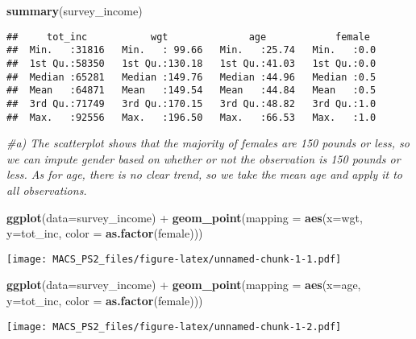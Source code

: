 \documentclass[]{article}
\newenvironment{Shaded}{\begin{snugshade}}{\end{snugshade}}
\newcommand{\KeywordTok}[1]{\textcolor[rgb]{0.13,0.29,0.53}{\textbf{{#1}}}}
\newcommand{\DataTypeTok}[1]{\textcolor[rgb]{0.13,0.29,0.53}{{#1}}}
\newcommand{\StringTok}[1]{\textcolor[rgb]{0.31,0.60,0.02}{{#1}}}
\newcommand{\CommentTok}[1]{\textcolor[rgb]{0.56,0.35,0.01}{\textit{{#1}}}}
\newcommand{\NormalTok}[1]{{#1}}
\begin{document}
\begin{Shaded}
\begin{Highlighting}[]
\KeywordTok{summary}\NormalTok{(survey_income)}
\end{Highlighting}
\end{Shaded}

\begin{verbatim}
##     tot_inc           wgt              age            female   
##  Min.   :31816   Min.   : 99.66   Min.   :25.74   Min.   :0.0  
##  1st Qu.:58350   1st Qu.:130.18   1st Qu.:41.03   1st Qu.:0.0  
##  Median :65281   Median :149.76   Median :44.96   Median :0.5  
##  Mean   :64871   Mean   :149.54   Mean   :44.84   Mean   :0.5  
##  3rd Qu.:71749   3rd Qu.:170.15   3rd Qu.:48.82   3rd Qu.:1.0  
##  Max.   :92556   Max.   :196.50   Max.   :66.53   Max.   :1.0
\end{verbatim}

\begin{Shaded}
\begin{Highlighting}[]
\CommentTok{#a) The scatterplot shows that the majority of females are 150 pounds or less, so we can impute gender based on whether or not the observation is 150 pounds or less. As for age, there is no clear trend, so we take the mean age and apply it to all observations. }

\KeywordTok{ggplot}\NormalTok{(}\DataTypeTok{data=}\NormalTok{survey_income) +}
\StringTok{  }\KeywordTok{geom_point}\NormalTok{(}\DataTypeTok{mapping =} \KeywordTok{aes}\NormalTok{(}\DataTypeTok{x=}\NormalTok{wgt, }\DataTypeTok{y=}\NormalTok{tot_inc, }\DataTypeTok{color =} \KeywordTok{as.factor}\NormalTok{(female)))}
\end{Highlighting}
\end{Shaded}

\texttt{[image: MACS\_PS2\_files/figure-latex/unnamed-chunk-1-1.pdf]}

\begin{Shaded}
\begin{Highlighting}[]
\KeywordTok{ggplot}\NormalTok{(}\DataTypeTok{data=}\NormalTok{survey_income) +}
\StringTok{  }\KeywordTok{geom_point}\NormalTok{(}\DataTypeTok{mapping =} \KeywordTok{aes}\NormalTok{(}\DataTypeTok{x=}\NormalTok{age, }\DataTypeTok{y=}\NormalTok{tot_inc, }\DataTypeTok{color =} \KeywordTok{as.factor}\NormalTok{(female)))}
\end{Highlighting}
\end{Shaded}

\texttt{[image: MACS\_PS2\_files/figure-latex/unnamed-chunk-1-2.pdf]}
\end{document}
